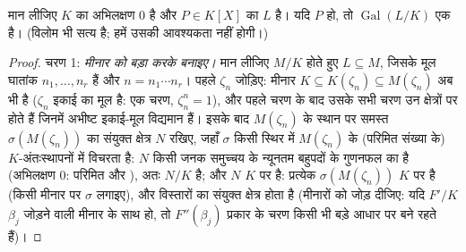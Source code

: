 \begin{theorem}[गाल्वा]\label{thm:b3:galois:solvable}
मान लीजिए $K$ का अभिलक्षण $0$ है और $P \in K[X]$ का 
$L$ है। यदि $P$  हो, तो $\operatorname{Gal}(L/K)$ एक  है। (विलोम भी सत्य है; हमें उसकी आवश्यकता नहीं
होगी।)
\end{theorem}

\begin{proof}
चरण 1: \emph{ मीनार को बड़ा करके  बनाइए।} मान लीजिए
$M/K$  होते हुए $L
\subseteq M$, जिसके मूल घातांक $n_1, \dots,
n_r$ हैं और
$n = n_1\cdots n_r$। पहले $\zeta_n$ जोड़िए: मीनार $K \subseteq K(\zeta_n) \subseteq M(\zeta_n)$ अब भी  है ($\zeta_n$
इकाई का मूल है: एक  चरण, $\zeta_n^n = 1$), और पहले चरण के बाद उसके सभी
चरण उन क्षेत्रों पर होते हैं जिनमें अभीष्ट इकाई-मूल विद्यमान
हैं। इसके बाद $M(\zeta_n)$ के स्थान पर समस्त $\sigma(M(\zeta_n))$ का संयुक्त क्षेत्र
$N$ रखिए, जहाँ $\sigma$ किसी स्थिर  में $M(\zeta_n)$ के
(परिमित संख्या के) $K$-अंतःस्थापनों में विचरता है: $N$ किसी
जनक समुच्चय के न्यूनतम बहुपदों के गुणनफल का  है
(अभिलक्षण $0$: परिमित और ), अतः $N/K$  है; और
$N$ $K$ पर  है: प्रत्येक $\sigma(M(\zeta_n))$ $K$ पर  है (किसी
 मीनार पर $\sigma$ लगाइए), और  विस्तारों का संयुक्त क्षेत्र
 होता है (मीनारों को जोड़ दीजिए: यदि $F'/K$ $\beta_j$ जोड़ने वाली
मीनार के साथ  हो, तो $F''(\beta_j)$ प्रकार के चरण किसी भी बड़े आधार
पर  बने रहते हैं)।


\end{proof}

